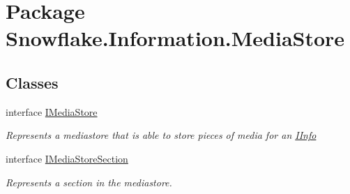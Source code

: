 \hypertarget{namespace_snowflake_1_1_information_1_1_media_store}{}\section{Package Snowflake.\+Information.\+Media\+Store}
\label{namespace_snowflake_1_1_information_1_1_media_store}
\subsection*{Classes}
\begin{DoxyCompactItemize}
\item 
interface \hyperlink{interface_snowflake_1_1_information_1_1_media_store_1_1_i_media_store}{I\+Media\+Store}
\begin{DoxyCompactList}\small\item\em Represents a mediastore that is able to store pieces of media for an \hyperlink{interface_snowflake_1_1_information_1_1_i_info}{I\+Info} \end{DoxyCompactList}\item 
interface \hyperlink{interface_snowflake_1_1_information_1_1_media_store_1_1_i_media_store_section}{I\+Media\+Store\+Section}
\begin{DoxyCompactList}\small\item\em Represents a section in the mediastore. \end{DoxyCompactList}\end{DoxyCompactItemize}
